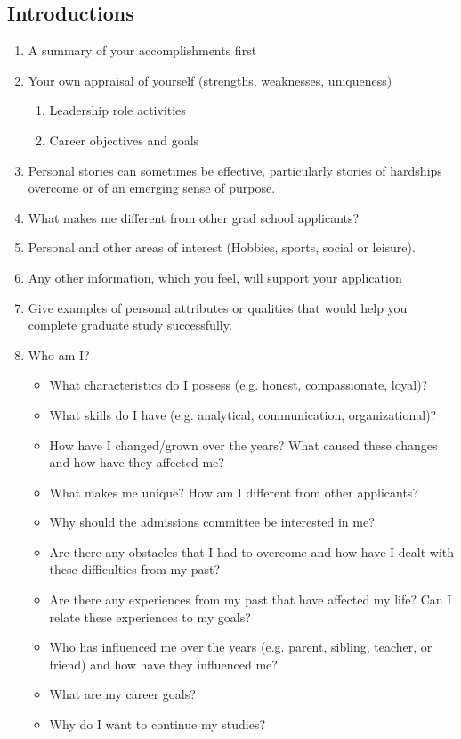 \documentclass[a4paper,12pt]{article}%
\begin{document}
\subsection{Introductions}
\label{sec:Introductions}
\begin{enumerate}
	\item	A summary of your accomplishments first	
	\item 	Your own appraisal of yourself (strengths, weaknesses, uniqueness)
		\begin{enumerate}
			\item 	Leadership role activities
			\item 	Career objectives and goals	
		\end{enumerate}
	  \hrulefill
	  \hrulefill
\item Personal stories can sometimes be effective, particularly stories of hardships overcome or of an emerging sense of purpose.

\hrulefill

	  \hrulefill
	  
\item  	What makes me different from other grad school applicants?
	\item  	Personal and other areas of interest (Hobbies, sports, social or leisure).
	\item  	Any other information, which you feel, will support your application
	\item Give examples of personal attributes or qualities that would help you complete graduate study successfully. 
		  \hrulefill
		  
	  \hrulefill
	  
\item  Who am I?		
\begin{itemize}
	\item What characteristics do I possess (e.g. honest, compassionate, loyal)?
	\item What skills do I have (e.g. analytical, communication, organizational)?
	\item How have I changed/grown over the years? What caused these changes and how have they affected me?
	\item What makes me unique? How am I different from other applicants?
	\item Why should the admissions committee be interested in me?
	\item Are there any obstacles that I had to overcome and how have I dealt with these difficulties from my past?
	\item Are there any experiences from my past that have affected my life? Can I relate these experiences to my goals?
	\item Who has influenced me over the years (e.g. parent, sibling, teacher, or friend) and how have they influenced me?
	\item What are my career goals?
	\item Why do I want to continue my studies?
\end{itemize}
 	  \hrulefill
 	  
		  \hrulefill
		  
	\end{enumerate}
	  \hrulefill
	  
\end{document}
